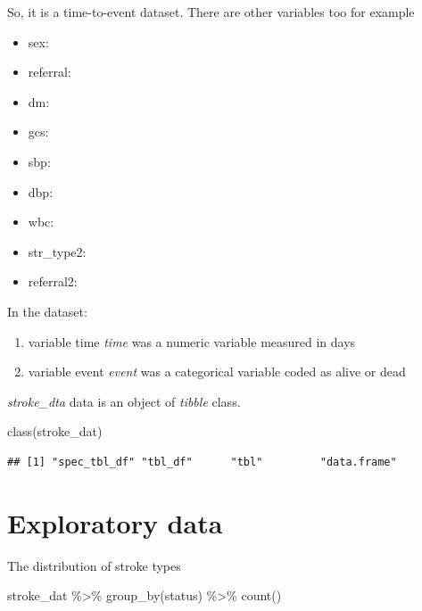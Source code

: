 \documentclass[
]{book}
\makeatletter
\newenvironment{Shaded}{\begin{snugshade}}{\end{snugshade}}
\newcommand{\FunctionTok}[1]{\textcolor[rgb]{0,0,0}{#1}}
\newcommand{\NormalTok}[1]{#1}
\newcommand{\SpecialCharTok}[1]{\textcolor[rgb]{0,0,0}{#1}}
\providecommand{\tightlist}{%
  \setlength{\itemsep}{0pt}\setlength{\parskip}{0pt}}
\newenvironment{kframe}{%
\medskip{}
\setlength{\fboxsep}{.8em}
 \def\at@end@of@kframe{}%
 \ifinner\ifhmode%
  \def\at@end@of@kframe{\end{minipage}}%
  \begin{minipage}{\columnwidth}%
 \fi\fi%
 \def\FrameCommand##1{\hskip\@totalleftmargin \hskip-\fboxsep
 \colorbox{shadecolor}{##1}\hskip-\fboxsep
     \hskip-\linewidth \hskip-\@totalleftmargin \hskip\columnwidth}%
 \MakeFramed {\advance\hsize-\width
   \@totalleftmargin\z@ \linewidth\hsize
   \@setminipage}}%
 {\par\unskip\endMakeFramed%
 \at@end@of@kframe}
\renewenvironment{Shaded}{\begin{kframe}}{\end{kframe}}
\makeatother
\begin{document}
So, it is a time-to-event dataset. There are other variables too for example

\begin{itemize}
\tightlist
\item
  sex:\\
\item
  referral:
\item
  dm:
\item
  gcs:
\item
  sbp:
\item
  dbp:
\item
  wbc:
\item
  str\_type2:
\item
  referral2:
\end{itemize}

In the dataset:

\begin{enumerate}
\def\labelenumi{\arabic{enumi}.}
\tightlist
\item
  variable time \emph{time} was a numeric variable measured in days
\item
  variable event \emph{event} was a categorical variable coded as alive or dead
\end{enumerate}

\emph{stroke\_dta} data is an object of \emph{tibble} class.

\begin{Shaded}
\begin{Highlighting}[]
\FunctionTok{class}\NormalTok{(stroke\_dat)}
\end{Highlighting}
\end{Shaded}

\begin{verbatim}
## [1] "spec_tbl_df" "tbl_df"      "tbl"         "data.frame"
\end{verbatim}

\hypertarget{exploratory-data}{%
\section{Exploratory data}\label{exploratory-data}}

The distribution of stroke types

\begin{Shaded}
\begin{Highlighting}[]
\NormalTok{stroke\_dat }\SpecialCharTok{\%\textgreater{}\%} \FunctionTok{group\_by}\NormalTok{(status) }\SpecialCharTok{\%\textgreater{}\%} \FunctionTok{count}\NormalTok{()}
\end{Highlighting}
\end{Shaded}
\end{document}

